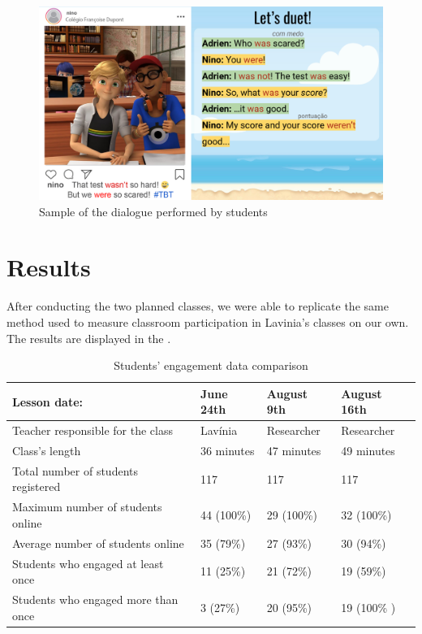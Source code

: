 \documentclass[english]{textolivre}
\begin{document}
\begin{figure}[h!]
\centering
\begin{minipage}{.8\textwidth}
 \includegraphics[width=\textwidth]{Fig6.png}
 \caption{Sample of the dialogue performed by students}
 \label{fig06}
\end{minipage}
\end{figure}


\section{Results}

After conducting the two planned classes, we were able to replicate the same method used to measure classroom participation in Lavinia’s classes on our own. The results are displayed in the .

\begin{table}[h!]
\centering
\begin{threeparttable}
\caption{Students’ engagement data comparison}
\label{tab2}
\begin{tabular}{p{6cm}lll}
\toprule
Lesson date: & June 24th & August 9th & August 16th \\
\midrule
Teacher responsible for the class & Lavínia & Researcher & Researcher \\
Class’s length  & 36 minutes  & 47 minutes & 49 minutes \\
Total number of students registered & 117 & 117 & 117                  \\
Maximum number of students online & 44 (100\%) & 29 (100\%)           & 32 (100\%) \\
Average number of students online & 35 (79\%) & 27 (93\%) & 30 (94\%)            \\
Students who engaged at least once & 11 (25\%) & 21 (72\%)            & 19 (59\%) \\
Students who engaged more than once & 3 (27\%) & 20 (95\%) & 19 (100\% ) \\
\bottomrule
\end{tabular}
\end{threeparttable}
\end{table}
\end{document}
